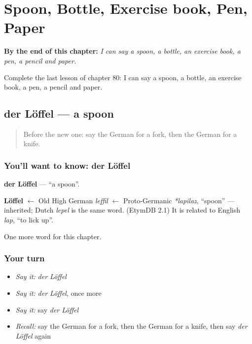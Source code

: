 
\chapter{Spoon, Bottle, Exercise book, Pen, Paper}
\label{ch:ge-spoon-bottle-exercise-book-pen-paper}

\begin{chapteropening}
\textbf{By the end of this chapter:} \emph{I can say a spoon, a bottle, an exercise book, a pen, a pencil and paper.}

Complete the last lesson of chapter 80: I can say a spoon, a bottle, an exercise book, a pen, a pencil and paper.
\end{chapteropening}

\section[der Löffel]{der Löffel — a spoon}

\label{lesson:GE-C80-loeffel}



\begin{quote}
Before the new one: say the German for a fork, then the German for a knife.
\end{quote}

\subsection*{You'll want to know: der Löffel}
\textbf{der Löffel} — \textquotedblleft{}a spoon\textquotedblright{}.

\begin{cousinweb}
\textbf{Löffel} $\leftarrow$ Old High German \emph{leffil} $\leftarrow$ Proto-Germanic \emph{*lapilaz}, \textquotedblleft{}spoon\textquotedblright{} — inherited; Dutch \emph{lepel} is the same word. (EtymDB 2.1) It is related to English \emph{lap}, \textquotedblleft{}to lick up\textquotedblright{}.
\end{cousinweb}

\begin{grammarlens}[title={What you've built}]
One more word for this chapter.
\end{grammarlens}

\subsection*{Your turn}
\begin{itemize}
\raggedright
  \item \emph{Say it:} \emph{der Löffel}
  \item \emph{Say it:} \emph{der Löffel}, once more
  \item \emph{Say it:} say \emph{der Löffel}
  \item \emph{Recall:} say the German for a fork, then the German for a knife, then say \emph{der Löffel} again
\end{itemize}

